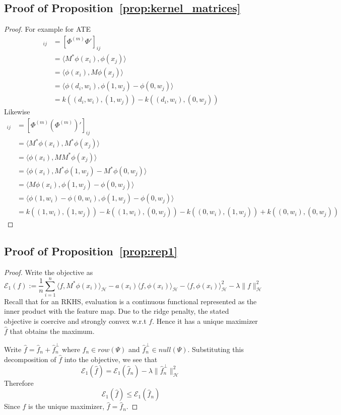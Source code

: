 \subsection{Proof of Proposition~\ref{prop:kernel_matrices}}

\begin{proof}
For example for ATE
\begin{align}
    [K^{(3)}]_{ij}&=[\Phi^{(m)}\Phi']_{ij} \\
    &=\langle M^*\phi(x_i),\phi(x_j)\rangle\\
    &=\langle \phi(x_i),M\phi(x_j)\rangle \\
    &= \langle \phi(d_i,w_i),\phi(1,w_j)-\phi(0,w_j)\rangle \\
    &=k((d_i,w_i),(1,w_j))-k((d_i,w_i),(0,w_j))
\end{align}
Likewise
\begin{align}
    [K^{(4)}]_{ij}&=[\Phi^{(m)}(\Phi^{(m)})']_{ij}\\
    &=\langle M^*\phi(x_i),M^* \phi(x_j)\rangle\\
    &=\langle \phi(x_i),M M^* \phi(x_j)\rangle\\
    &=\langle \phi(x_i),M^* \phi(1,w_j)-M^*\phi(0,w_j)\rangle \\
    &=\langle M\phi(x_i),\phi(1,w_j)-\phi(0,w_j) \rangle \\
    &=\langle \phi(1,w_i)-\phi(0,w_i),\phi(1,w_j)-\phi(0,w_j) \rangle \\
    &=k((1,w_i),(1,w_j))-k((1,w_i),(0,w_j))-k((0,w_i),(1,w_j))+k((0,w_i),(0,w_j))
\end{align}
\end{proof}

\subsection{Proof of Proposition~\ref{prop:rep1}}

\begin{proof}
Write the objective as 
$$
\mathcal{E}_{1}(f):=\frac{1}{n}\sum_{i=1}^n \langle f,M^*\phi(x_i)\rangle_{\mathcal{H}}-a(x_i)\langle f,\phi(x_i)\rangle_{\mathcal{H}}-\langle f,\phi(x_i)\rangle_{\mathcal{H}}^2-\lambda\|f\|^2_{\mathcal{H}}
$$
Recall that for an RKHS, evaluation is a continuous functional represented as the inner product with the feature map. Due to the ridge penalty, the stated objective is coercive and strongly convex w.r.t $f$. Hence it has a unique maximizer $\hat{f}$ that obtains the maximum.

Write $\hat{f}=\hat{f}_n+\hat{f}^{\perp}_n$ where $\hat{f}_n\in row(\Psi)$ and $\hat{f}_n^{\perp}\in null(\Psi)$. Substituting this decomposition of $\hat{f}$ into the objective, we see that
$$
\mathcal{E}_{1}(\hat{f})=\mathcal{E}_{1}(\hat{f}_n)-\lambda \|\hat{f}_n^{\perp}\|^2_{\mathcal{H}}
$$
Therefore
$$
\mathcal{E}_{1}(\hat{f})\leq \mathcal{E}_{1}(\hat{f}_n)
$$
Since $\hat{f}$ is the unique maximizer, $\hat{f}=\hat{f}_n$.
\end{proof}


